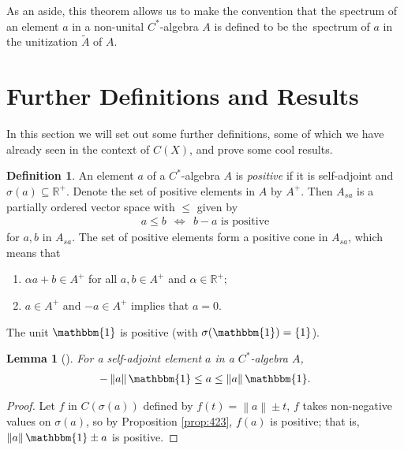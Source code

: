\documentclass[11pt,a4paper]{report}
\theoremstyle{plain}
\newtheorem{lemma}{Lemma}
\theoremstyle{definition}
\newtheorem{defn}{Definition}
\newcommand{\1}{\mathbbm{1}}
\newcommand{\R}{\mathbb{R}}
\newcommand{\CX}{C(X)}
\newcommand{\spec}[1]{\sigma(#1)}
\begin{document}
As an aside, this theorem allows us to make the convention that the spectrum of 
an element $a$ in a non-unital $C^\ast$-algebra $A$ is defined to be 
the~spectrum of $a$ in the unitization $\tilde A$ of $A$.





\section{Further Definitions and Results}
In this section we will set out some further definitions, some of which we have 
already seen in the context of $\CX$, and prove some cool results.


\begin{defn}
	An element $a$ of a $C^\ast$-algebra $A$ is \emph{positive} if it is 
	self-adjoint and $\spec a\subseteq \R^+$. Denote the set of positive elements 
	in $A$ by $A^+$. Then $A_{sa}$ is a partially ordered vector space with $\leq$ 
	given by
	\begin{align*}
		a\leq b ~~\iff~~ b-a \mbox{ is positive}
	\end{align*}
	for $a,b$ in $A_{sa}$.
	The set of positive elements form a positive cone in $A_{sa}$, which means that 
	\begin{enumerate}
		\item 	$\alpha a+b\in A^+$ for all $a,b \in A^+$ and $\alpha\in \R^+$;
		\item	$a\in A^+$ and $-a\in A^+$ implies that $a=0$.
	\end{enumerate}
\end{defn}

The unit $\1$ is positive (with $\spec \1 = \left\{1\right\}$). 

\begin{lemma}[{\cite[4.2.3(ii)]{kadison83}}]\label{lemma:423}
	For a self-adjoint element $a$ in a $C^\ast$-algebra $A$, 
	\begin{align*}
		-\left\|a\right\|\1 \leq a\leq\left\|a\right\|\1.
	\end{align*}
\end{lemma}
\begin{proof}
	Let $f$ in $C(\spec a)$ defined by $f(t) = \left\|a\right\| \pm t$, $f$ takes 
	non-negative values on $\spec a$, so by Proposition \ref{prop:423}, $f(a)$ is 
	positive; that is, $\left\|a\right\|\1 \pm a$ is positive.

\end{proof}
	
\end{document}
